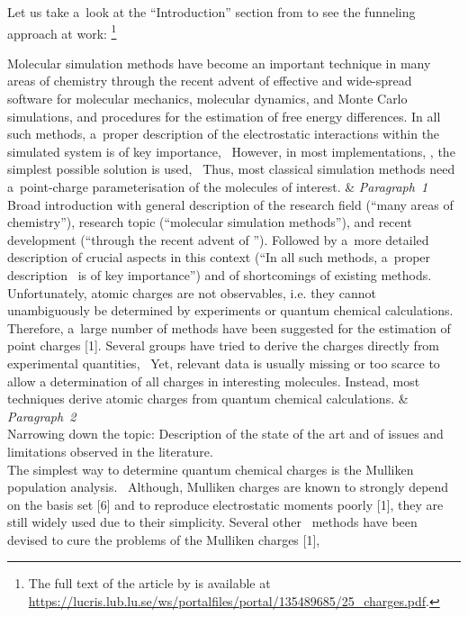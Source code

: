 Let us take a~look at the ``Introduction'' section from \citet{sigfridsson} to see the funneling approach at work:%
\footnote{The full text of the article by \citet{sigfridsson} is available at \url{https://lucris.lub.lu.se/ws/portalfiles/portal/135489685/25_charges.pdf}.}
\begin{longtblr}{}
	Molecular simulation methods have become an important technique in many areas of chemistry through the recent advent of effective and wide-spread software for molecular mechanics, molecular dynamics, and Monte Carlo simulations, and procedures for the estimation of free energy differences. In all such methods, a~proper description of the electrostatic interactions within the simulated system is of key importance, \textellipsis\ However, in most implementations, \textellipsis, the simplest possible solution is used, \textellipsis\ Thus, most classical simulation methods need a~point-charge parameterisation of the molecules of interest.
	&
	{%
		\textit{Paragraph~1} \\
		\textmd{Broad introduction with general description of the research field (``many areas of
		chemistry''), research topic (``molecular simulation methods''), and recent development (``through the recent advent of \textellipsis''). Followed by a~more detailed description of crucial aspects in this context (``In all such methods, a~proper description \textellipsis\ is of key importance'') and of shortcomings of existing methods.}
	}
	\\
	\hspace{\smalllinespacing}Unfortunately, atomic charges are not observables, i.e. they cannot unambiguously be determined by experiments or quantum chemical calculations. Therefore, a~large number of methods have been suggested for the estimation of point charges [1]. Several groups have tried to derive the charges directly from experimental quantities, \textellipsis\ Yet, relevant data is usually missing or too scarce to allow a determination of all charges in interesting molecules. Instead, most techniques derive atomic charges from quantum chemical calculations.
	&
	{%
		\textit{Paragraph~2} \\
		Narrowing down the topic: Description of the state of the art and of issues and limitations observed in the literature.%
	}
	\\
	{%
		\hspace{\smalllinespacing}The simplest way to determine quantum chemical charges is the Mulliken population
		analysis. \textellipsis\ Although, Mulliken charges are known to strongly depend on the basis set [6] and to reproduce electrostatic moments poorly [1], they are still widely used due to their simplicity. Several other \textellipsis\ methods have been devised to cure the problems of the Mulliken charges [1], \textellipsis
}
\end{longtblr}
